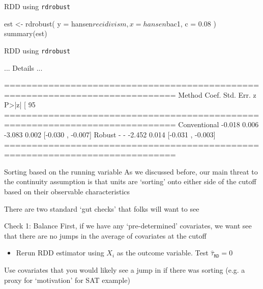 \documentclass[aspectratio=169,t,11pt,table]{beamer}
\begin{document}

\begin{frame}[fragile]{RDD using \texttt{rdrobust}}{}
  \begin{codeblock}
est <- rdrobust(
  y = hansen$recidivism, x = hansen$bac1, c = 0.08
)
summary(est)
  \end{codeblock}
\end{frame}

\begin{frame}[fragile]{RDD using \texttt{rdrobust}}{}
  \begin{codeblock}[{}]
... Details ...

=============================================================================
        Method     Coef. Std. Err.         z     P>|z|      [ 95%
=============================================================================
  Conventional    -0.018     0.006    -3.083     0.002    [-0.030 , -0.007]    
        Robust         -         -    -2.452     0.014    [-0.031 , -0.003]    
=============================================================================
  \end{codeblock}
\end{frame}


\begin{frame}{Sorting based on the running variable}{}
  As we discussed before, our main threat to the continuity assumption is that units are `sorting' onto either side of the cutoff based on their observable characteristics

  There are two standard `gut checks' that folks will want to see
\end{frame}

\begin{frame}{Check 1: Balance}{}
  First, if we have any `pre-determined' covariates, we want see that there are no jumps in the average of covariates at the cutoff
  \begin{itemize}
    \item Rerun RDD estimator using $X_i$ as the outcome variable. Test $\hat{\tau}_{\texttt{RD}}= 0$
  \end{itemize}

  \bigskip
  Use covariates that you would likely see a jump in if there was sorting (e.g. a proxy for `motivation' for SAT example)
\end{frame}

\end{document}
